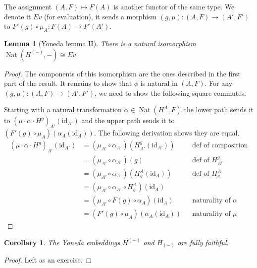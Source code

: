 \documentclass{article}
\newtheorem{cor}[thm]{Corollary}
\newtheorem{lem}[thm]{Lemma}
\theoremstyle{definition}
\theoremstyle{remark}
\DeclareMathOperator{\Nat}{Nat}
\newcommand{\id}{\text{id}}
\begin{document}
The assignment $(A,F) \mapsto F(A)$ is another functor of the same type. We denote it $Ev$ (for evaluation), it sends a morphism $(g,\mu): (A,F) \rightarrow (A',F')$ to $F'(g) \circ \mu_A :F(A) \rightarrow F'(A')$.

\begin{lem}[Yoneda lemma II]
	There is a natural isomorphism $\Nat(H^{(-)}, -) \cong Ev$.
\end{lem}
\begin{proof}
	The components of this isomorphism are the ones described in the first part of the result. It remains to show that $\phi$ is natural in $(A,F)$. For any $(g, \mu): (A,F) \rightarrow (A',F')$, we need to show the following square commutes.
	\begin{figure}[H]
		\centering
	\end{figure}

	Starting with a natural transformation $\alpha \in \Nat(H^A,F)$ the lower path sends it to $(\mu\cdot \alpha \cdot H^g)_{A'}(\id_{A'})$ and the upper path sends it to $(F'(g) \circ \mu_A)(\alpha_A(\id_A))$. The following derivation shows they are equal.
	\begin{align*}
		(\mu\cdot \alpha \cdot H^g)_{A'}(\id_{A'}) &= (\mu_{A'}\circ \alpha_{A'})(H^g_{A'}(\id_{A'}))&&\mbox{def of composition}\\
		&= (\mu_{A'}\circ \alpha_{A'})(g)&&\mbox{def of $H^g_{A'}$}\\
		&= (\mu_{A'}\circ \alpha_{A'})(H^A_g(\id_A))&&\mbox{def of $H^A_g$}\\
		&= (\mu_{A'}\circ \alpha_{A'} \circ H^A_g)(\id_A)\\
		&= (\mu_{A'} \circ F(g) \circ \alpha_A)(\id_A)&&\mbox{naturality of $\alpha$}\\
		&=(F'(g) \circ \mu_A)(\alpha_A(\id_A)) &&\mbox{naturality of $\mu$}
	\end{align*}
\end{proof}

\begin{cor}
	The Yoneda embeddings $H^{(-)}$ and $H_{(-)}$ are fully faithful.
\end{cor}
\begin{proof}
	Left as an exercise.
\end{proof}
\end{document}
